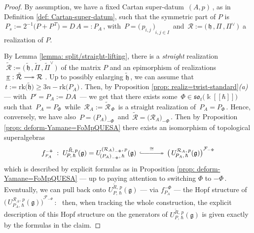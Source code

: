 \documentclass[12pt,reqno,twoside,a4paper]{amsart}
\numberwithin{equation}{section}
\theoremstyle{definition}
\newtheorem{free text}[lema]{}
\theoremstyle{remark}
\newcommand{\R}{{\mathcal R}}
\newcommand{\F}{{\mathcal F}}
\def \kh{{\Bbbk[[\hbar]]}}
\def \lieg{\mathfrak{g}}
\def \lieh{\mathfrak{h}}
\def \lieso{\mathfrak{so}}
\theoremstyle{plain}
\begin{document}
\begin{proof}
%
 By assumption, we have a fixed Cartan super-datum  $ \, (A,p) \, $,  as in  Definition \ref{def: Cartan-super-datum},  such that the symmetric part of  $ P $  is  $ \, P_s := 2^{-1} \big( P + P^{\,\scriptscriptstyle T} \big) = D\,A =: P_A \, $,  with  $ \, P = {\big(\, p_{i,j} \,\big)}_{i,j \in I} \, $  and  $ \, \R := \big(\, \lieh \, , \Pi \, , \Pi^\vee \,\big) \, $  a realization of  $ P $.
                                                                  \par
   By  Lemma \ref{lemma: split/straight-lifting},  there is a  \textsl{straight\/}  realization  $ \; \tilde{\R} := \big(\,\tilde{\lieh} \, , \tilde{\Pi} \, , {\tilde{\Pi}}^\vee \,\big) \, $   of the matrix  $ P $  and an epimorphism of realizations  $ \; \underline{\pi} : \tilde{\R} \relbar\joinrel\twoheadrightarrow \R \; $.  Up to possibly enlarging  $ \tilde{\lieh} \, $,  we can assume that  $ \, t := \text{rk}\big(\tilde{\lieh}\big) \geq 3n - \text{rk}\big(P_A\big) \, $.  Then, by  Proposition \ref{prop: realiz=twist-standard}\textit{(a)}   --- with  $ \, P' = P_A := DA \, $  ---   we get that there exists some  $ \, \Phi \in \lieso_t\big(\kh\big) \, $  such that  $ \, P_A = P_{\scriptscriptstyle \Phi} \, $  while  $ \, \R_A := \tilde{\R}_{\,\scriptscriptstyle \Phi} \, $  is a straight realization of  $ \, P_A = P_{\scriptscriptstyle \Phi} \, $.  Hence, conversely, we have also  $ \, P = {\big( P_A \big)}_{\scriptscriptstyle -\Phi} \, $  and  $ \, \tilde{\R} = {\big( \R_A \big)}_{\scriptscriptstyle -\Phi} \, $.  Then by  Proposition \ref{prop: deform-Yamane=FoMpQUESA}  there exists an isomorphism of topological superalgebras
%
  $$  f^{\scriptscriptstyle -\Phi}_{\scriptscriptstyle P_A} \; :
   \; U_{\!P,\,\hbar}^{\tilde{R},\,p}(\lieg) = U_{\!{(P_A)}_{-\Phi},\,\hbar}^{{(\R_A)}_{\scriptscriptstyle -\Phi},\,p}(\lieg)  \,\; {\buildrel \cong \over
{\lhook\joinrel\relbar\joinrel\relbar\joinrel\relbar\joinrel\relbar\joinrel\twoheadrightarrow}} \;\,   {\big(\, U_{\!P_A,\,\hbar}^{\R_A,\,p}(\lieg)\big)}^{\F_{-\Phi}}  $$
%
 which is described by explicit formulas as in  Proposition \ref{prop: deform-Yamane=FoMpQUESA}    --- up to paying attention to switching  $ \Phi $  to  $ -\Phi \, $.  Eventually, we can pull back onto  $ U_{\!P,\,\hbar}^{\tilde{R},\,p}(\lieg) $   --- via  $ f^{\scriptscriptstyle -\Phi}_{\scriptscriptstyle P_A} $  ---   the Hopf structure of  $ {\big(\, U_{\!P_A,\,\hbar}^{\R_A,\,p}(\lieg)\big)}^{\F_{-\Phi}} \, $:  \, then, when tracking the whole construction, the explicit description of this Hopf structure on the generators of  $ U_{\!P,\,\hbar}^{\tilde{R},\,p}(\lieg) $  is given exactly by the formulas in the claim.

\end{proof}
\end{document}
